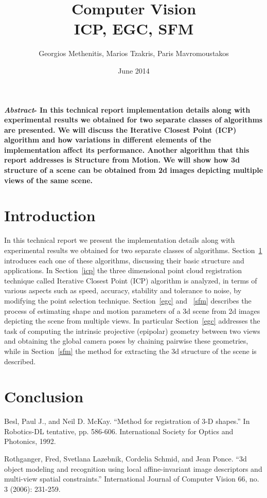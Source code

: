 \documentclass[11pt,twocolumn]{article}
\title{Computer Vision\\ICP, EGC, SFM}
\author{Georgios Methenitis, Marios Tzakris, Paris Mavromoustakos}
\affil{University of Amsterdam}
\date{June 2014}
\begin{document}
\maketitle

\renewcommand{\labelenumi}{\alph{enumi}.}



\textbf{\textit{Abstract}- In this technical report implementation details along with experimental results we obtained for two separate classes of algorithms are presented. We will discuss the Iterative Closest Point (ICP) algorithm and how variations in different elements of the implementation affect its performance. Another algorithm that this report addresses is Structure from Motion. We will show how 3d structure of a scene can be obtained from 2d images depicting multiple views of the same scene.}


\section{Introduction}
\label{introduction}
In this technical report we present the implementation details along with experimental results we obtained for two separate classes of algorithms. Section~\ref{introduction} introduces each one of these algorithms, discussing their basic structure and applications. In Section~\ref{icp} the three dimensional point cloud registration technique called Iterative Closest Point\cite{icp} (ICP) algorithm is analyzed, in terms of various aspects such as speed, accuracy, stability and tolerance to noise, by modifying the point selection
technique.
Section~\ref{egc} and ~\ref{sfm} describes the process of estimating shape and motion parameters of a 3d scene from 2d images depicting the scene from multiple views. In particular Section~\ref{egc} addresses the task of computing the intrinsic projective (epipolar) geometry between two views and obtaining the global camera poses by chaining pairwise these geometries, while in Section~\ref{sfm} the method for extracting the 3d structure of the scene is described.











\section{Conclusion}
\label{conclusion}


\begin{thebibliography}{9}

Besl, Paul J., and Neil D. McKay. ``Method for registration of 3-D shapes.'' In Robotics-DL tentative, pp. 586-606. International Society for Optics and Photonics, 1992.

Rothganger, Fred, Svetlana Lazebnik, Cordelia Schmid, and Jean Ponce. ``3d object modeling and recognition using local affine-invariant image descriptors and multi-view spatial constraints.'' International Journal of Computer Vision 66, no. 3 (2006): 231-259.

\end{thebibliography}
\end{document}
